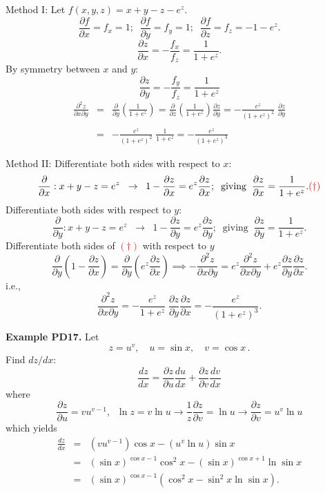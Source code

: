 \documentclass{article}
\newcommand{\pd}{\partial}
\begin{document}
Method I: Let $f(x,y,z)=x+y-z-e^z$.
$$
\frac{\pd f}{\pd x} = f_x = 1; \;\;\frac{\pd f}{\pd y} = f_y = 1;
\;\;\frac{\pd f}{\pd z} = f_z = -1-e^z.
$$
$$
 \frac{\partial z}{\partial x} = - \frac{f_ x}{f_z}= \frac{1 }{ 1+e^z}.
$$
By symmetry between $x$ and $y$:
$$
\frac{\partial z} {\partial y} = - \frac{f_y}{f_z}=\frac{1 }{
1+e^z}
$$
$$
\begin{array}{lll}
\frac{\pd^2 z }{\pd x \pd y} & = & \frac{\pd }{\pd y} \left( \frac{1
}{ 1+e^z} \right) = \frac{\pd }{\pd z} \left( \frac{1
}{ 1+e^z} \right) \frac{\pd z}{\pd y} =   -\frac{e^z}{ (1+e^z)^2} \;\frac{\partial z}
{\partial y}\\
\\
& = & -\frac{e^z}{ (1+e^z)^2} \; \frac{1 }{ 1+e^z} =-\frac{e^z }{ (1+e^z)^3}
\end{array}
$$


Method II: Differentiate both sides with respect to $x$:
$$
\frac{\pd}{\pd x}: x+y-z=e^z \;\; \to \;\; 1-\frac{\pd z}{\pd x}=e^z \frac{\pd z}{\pd
x};  \;\; \mbox{giving} \;\;  \frac{\partial z}{\partial x} = \frac{1 }{
1+e^z}. \hfill \textcolor{red}{( \dagger)}
$$
Differentiate both sides with respect to $y$:
$$
\frac{\pd}{\pd y}: x+y-z=e^z \;\; \to \;\; 1-\frac{\pd z}{\pd y}=e^z \frac{\pd z}{\pd
y};  \;\;  \mbox{giving}\;\;  \frac{\partial z}{\partial y} = \frac{1 }{
1+e^z}.
$$
Differentiate both sides of \textcolor{red}{$(\dagger)$} with respect to $y$
{
$$
\frac{\pd}{\pd y} \left( 1-\frac{\pd z}{\pd x} \right) = \frac{\pd}{\pd y} \left( e^z \frac{\pd z}{\pd
x} \right) \implies -\frac{\pd^2 z}{\pd x \pd y } =e^z \frac{\pd^2 z}{\pd x \pd y} +
 e^z \frac{\pd z}{\pd y}  \frac{\pd z}{\pd x}  .
$$
}
i.e.,
$$
\frac{\pd^2 z}{\pd x \pd y } = - \frac{e^z }{ 1+e^z} \;\frac{\pd
z}{\pd y}  \frac{\pd z}{\pd x}= -\frac{e^z }{ (1+e^z)^3}.
$$


\textbf{Example PD17.} Let
$$
z=u^v, \quad u=\sin x , \quad v=\cos x\,.
$$
Find $dz/dx$:
$$
\frac{d z}{d x} =\frac{\pd z}{\pd u} \frac{d u}{d x}+\frac{\pd
z}{\pd v} \frac{d v}{d x}
$$
where
$$
\frac{\pd z}{\pd u}=v u^{v-1}, \;\; \ln z = v \ln u \to \frac{1}{z} \frac{\pd z}{\pd v} = \ln u \to \frac{\pd z}{\pd v}= u^v \ln u
$$
which yields
$$
\begin{array}{lll}
\frac{d z}{d x} & = & \left( v u^{v-1} \right) \cos x - \left( u^v \ln u \right) \sin x \\
& = & (\sin x)^{\cos x -1}  \cos^2 x -   (\sin x)^{\cos x +1} \ln \sin x \\
& = & (\sin x)^{\cos x -1} \left( \cos^2 x - \sin^2 x \ln \sin x\right) .
\end{array}
$$
\end{document}
